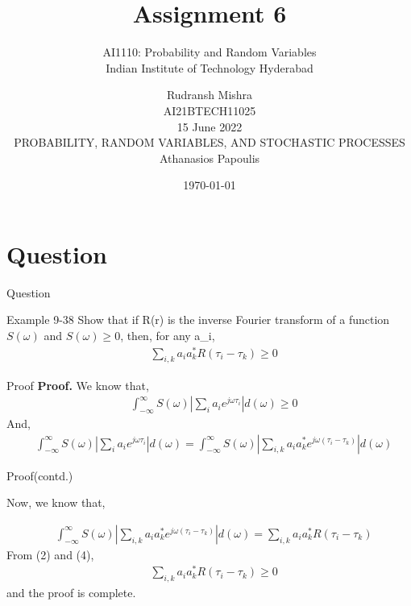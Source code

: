 \documentclass{beamer}
\title{Assignment 6}
\subtitle{\Large AI1110: Probability and Random Variables \\ \large Indian Institute of Technology Hyderabad}
\author{Rudransh Mishra \\ \normalsize AI21BTECH11025 \\ \vspace*{20pt} \normalsize  15 June 2022 \\ \vspace*{20pt} PROBABILITY, RANDOM VARIABLES, AND STOCHASTIC PROCESSES\\ \normalsize Athanasios Papoulis}
\date{\today}
\begin{document}
\begin{frame}
    \titlepage 
\end{frame}

\logo{}


\section{Question}
\begin{frame}{Question}
\begin{block}{Example 9-38}
Show that if R(r) is the inverse Fourier transform of a function $S(\omega)$ and $S(\omega) \geq 0$, then, for any a_i,\\
\begin{align}
&\sum_{i,k}^{} a_i a_k^{*} R(\tau_i - \tau_k) \geq 0
\end{align}
\end{block}
\end{frame}

\begin{frame}{Proof}
\textbf{Proof.}
We know that,
\begin {align}
&\int_{-\infty}^{\infty}S(\omega) |\sum_{i}^{} a_i e^{j \omega \tau_i}|d(\omega)\geq 0
\end {align}
And,
\begin {align}
&\int_{-\infty}^{\infty}S(\omega) | \sum_{i}^{} a_i e^{j \omega \tau_i}|d(\omega) = \int_{-\infty}^{\infty}S(\omega) | \sum_{i,k}^{} a_i a_k^{*} e^{j \omega (\tau_i-\tau_k)}| d(\omega)
\end {align}
\end{frame}
\begin{frame}{Proof(contd.)}

\begin{center}
Now, we know that,

\begin {align}
&\int_{-\infty}^{\infty}S(\omega) | \sum_{i,k}^{} a_i a_k^{*} e^{j \omega (\tau_i-\tau_k)}| d(\omega)=\sum_{i,k}^{} a_i a_k^{*} R(\tau_i - \tau_k)
\end {align}
From (2) and (4),
\begin {align}
&\sum_{i,k}^{} a_i a_k^{*} R(\tau_i - \tau_k) \geq 0
\end {align}
and the proof is complete.
\end{center}

\end{frame}
\end{document}
